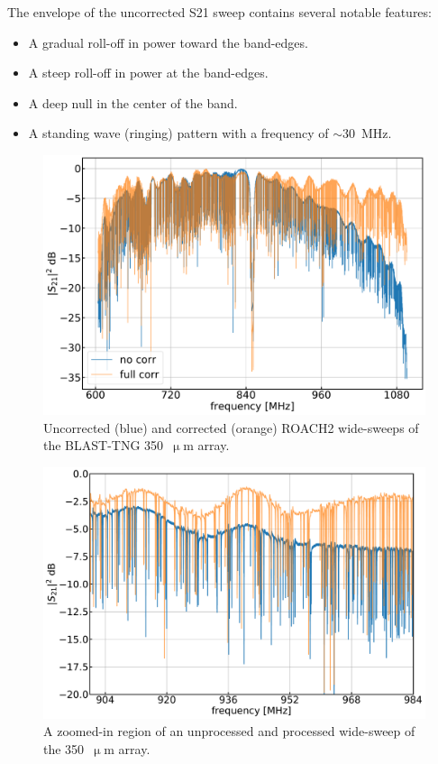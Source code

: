 The envelope of the uncorrected \gls{S21} sweep contains several notable features:

\begin{itemize}[nosep]
  \item A gradual roll-off in power toward the band-edges.
  \item A steep roll-off in power at the band-edges.
  \item A deep null in the center of the band.
  \item A standing wave (ringing) pattern with a frequency of $\sim$30~MHz.
\end{itemize}

\begin{figure}[!htbp]
\centering
\includegraphics[width=\textwidth]{figures/blast_data/sweeps/350_wide_sweep}
\caption[~Comparison between raw and corrected wide-sweeps of the  array.]{Uncorrected (blue) and corrected (orange) ROACH2 wide-sweeps of the BLAST-TNG 350~$\upmu$m array.}
\label{fig:350 wide sweep}
\end{figure}

\begin{figure}[!htbp]
\centering
\includegraphics[width=\textwidth]{figures/blast_data/sweeps/350_wide_sweep_zoom}
\caption[~A zoomed-in region of an unprocessed and processed wide-sweep of the  array.]{A zoomed-in region of an unprocessed and processed wide-sweep of the 350~$\upmu$m array.}
\label{fig:350 zoom}
\end{figure}

